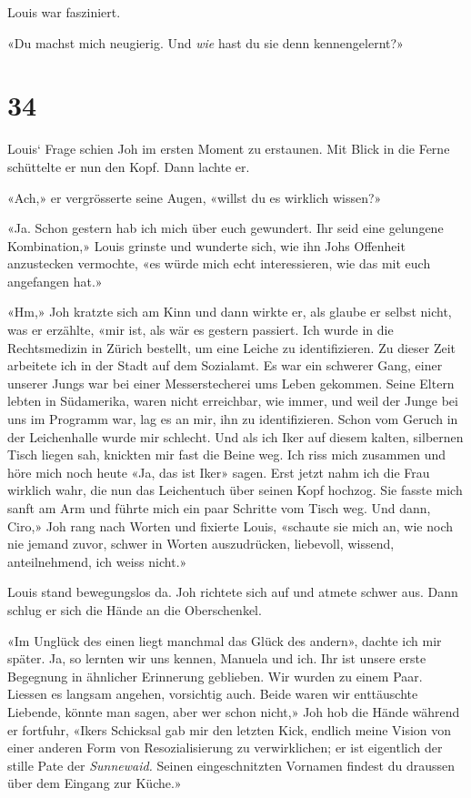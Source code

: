 Louis war fasziniert.

«Du machst mich neugierig. Und \emph{wie} hast du sie denn
kennengelernt?»

\chapter{34}\label{section-33}

Louis` Frage schien Joh im ersten Moment zu erstaunen. Mit Blick in die
Ferne schüttelte er nun den Kopf. Dann lachte er.

«Ach,» er vergrösserte seine Augen, «willst du es wirklich wissen?»

«Ja. Schon gestern hab ich mich über euch gewundert. Ihr seid eine
gelungene Kombination,» Louis grinste und wunderte sich, wie ihn Johs
Offenheit anzustecken vermochte, «es würde mich echt interessieren, wie
das mit euch angefangen hat.»

«Hm,» Joh kratzte sich am Kinn und dann wirkte er, als glaube er selbst
nicht, was er erzählte, «mir ist, als wär es gestern passiert. Ich wurde
in die Rechtsmedizin in Zürich bestellt, um eine Leiche zu
identifizieren. Zu dieser Zeit arbeitete ich in der Stadt auf dem
Sozialamt. Es war ein schwerer Gang, einer unserer Jungs war bei einer
Messerstecherei ums Leben gekommen. Seine Eltern lebten in Südamerika,
waren nicht erreichbar, wie immer, und weil der Junge bei uns im
Programm war, lag es an mir, ihn zu identifizieren. Schon vom Geruch in
der Leichenhalle wurde mir schlecht. Und als ich Iker auf diesem kalten,
silbernen Tisch liegen sah, knickten mir fast die Beine weg. Ich riss
mich zusammen und höre mich noch heute «Ja, das ist Iker» sagen. Erst
jetzt nahm ich die Frau wirklich wahr, die nun das Leichentuch über
seinen Kopf hochzog. Sie fasste mich sanft am Arm und führte mich ein
paar Schritte vom Tisch weg. Und dann, Ciro,» Joh rang nach Worten und
fixierte Louis, «schaute sie mich an, wie noch nie jemand zuvor, schwer
in Worten auszudrücken, liebevoll, wissend, anteilnehmend, ich weiss
nicht.»

Louis stand bewegungslos da. Joh richtete sich auf und atmete schwer
aus. Dann schlug er sich die Hände an die Oberschenkel.

«Im Unglück des einen liegt manchmal das Glück des andern», dachte ich
mir später. Ja, so lernten wir uns kennen, Manuela und ich. Ihr ist
unsere erste Begegnung in ähnlicher Erinnerung geblieben. Wir wurden zu
einem Paar. Liessen es langsam angehen, vorsichtig auch. Beide waren wir
enttäuschte Liebende, könnte man sagen, aber wer schon nicht,» Joh hob
die Hände während er fortfuhr, «Ikers Schicksal gab mir den letzten
Kick, endlich meine Vision von einer anderen Form von Resozialisierung
zu verwirklichen; er ist eigentlich der stille Pate der
\emph{Sunnewaid.} Seinen eingeschnitzten Vornamen findest du draussen
über dem Eingang zur Küche.»

